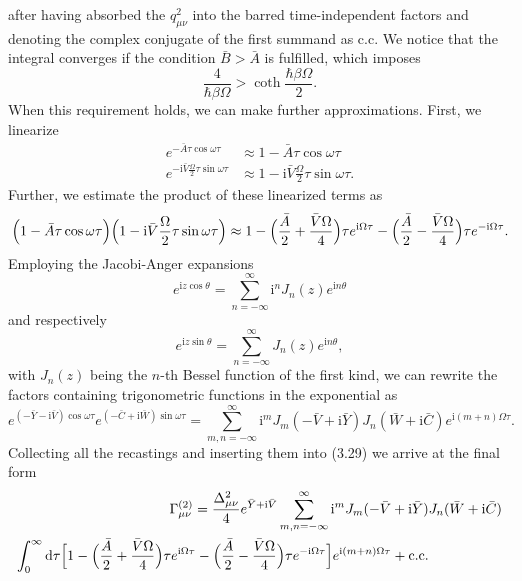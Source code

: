 %
after having absorbed the $q_{\mu\nu}^2$ into the barred time-independent factors and denoting
the complex conjugate of the first summand as c.c. We notice that the integral converges
if the condition $\bar{B}>\bar{A}$ is fulfilled, which imposes
%
\begin{equation}
    \frac{4}{\hbar\beta\Omega}>\coth\frac{\hbar\beta\Omega}{2}.
\end{equation}
%
When this requirement holds, we can make further approximations. First, we linearize
%
\begin{align}
    e^{ -\bar{A} \tau \cos\omega\tau} &\approx 1-\bar{A}\tau\cos\omega\tau \\
    e^{-\text{i}\bar{V} \frac{\Omega}{2} \tau\sin\omega\tau} &\approx 1-\text{i}\bar{V} \frac{\Omega}{2} \tau\sin\omega\tau.
\end{align}
%
Further, we estimate the product of these linearized terms as
%
\begin{equation}
    \Bigl(1-\bar{A}\tau\cos\omega\tau\Bigr)\Bigl(1-\text{i}\bar{V}\frac{\Omega}{2}\tau\sin\omega\tau\Bigr)
    \approx 1-\Bigl(\frac{\bar{A}}{2}+\frac{\bar{V}\Omega}{4}\Bigr)\tau e^{\text{i}\Omega\tau}
    -\Bigl(\frac{\bar{A}}{2}-\frac{\bar{V}\Omega}{4}\Bigr)\tau e^{-\text{i}\Omega\tau}.
\end{equation}
%
Employing the Jacobi-Anger expansions
%
\begin{equation}
    e^{\text{i}z\cos\theta} = \sum_{n=-\infty}^{\infty}\text{i}^n J_n(z)e^{\text{i}n\theta}
\end{equation}
%
and respectively
%
\begin{equation}
    e^{\text{i}z\sin\theta} = \sum_{n=-\infty}^{\infty}J_n(z)e^{\text{i}n\theta},
\end{equation}
%
with $J_n(z)$ being the $n$-th Bessel function of the first kind, we can rewrite the factors
containing trigonometric functions in the exponential as 
%
\begin{equation}
    e^{(-\bar{Y}-\text{i}\bar{V})\cos\omega\tau}e^{(-\bar{C}+\text{i}\bar{W})\sin\omega\tau}
    = \sum_{m,n=-\infty}^{\infty}\text{i}^m J_m(-\bar{V}+\text{i}\bar{Y})J_n(\bar{W}+\text{i}\bar{C})
    e^{\text{i}(m+n)\Omega\tau}.
\end{equation}
%
Collecting all the recastings and inserting them into (3.29) we arrive at the final form
%
\begin{align}
    \Gamma_{\mu\nu}^{(2)} = \frac{\Delta_{\mu\nu}^2}{4} e^{ \bar{Y} + \text{i} \bar{V}}
    \sum_{m,n=-\infty}^{\infty}\text{i}^m J_m(-\bar{V}+\text{i}\bar{Y})&J_n(\bar{W}+\text{i}\bar{C}) \\
    \int_{0}^{\infty}\text{d}\tau
    \Bigl[ 1-\Bigl(\frac{\bar{A}}{2}+\frac{\bar{V}\Omega}{4}\Bigr)\tau e^{\text{i}\Omega\tau}
    -\Bigl(\frac{\bar{A}}{2}-\frac{\bar{V}\Omega}{4}\Bigr)\tau e^{-\text{i}\Omega\tau}\Bigr]
    e^{\text{i}(m+n)\Omega\tau} + \text{c.c}.
\end{align}
